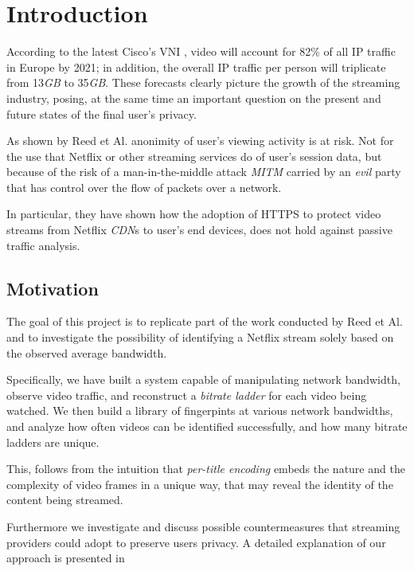 \chapter{Introduction}\label{sec:introduction}

According to the latest Cisco's VNI \cite{video-traffic-forecast}, video will
account for 82\% of all IP traffic in Europe by 2021; in addition, the overall IP
traffic per person will triplicate from 13\emph{GB} to 35\emph{GB}. These
forecasts clearly picture the growth of the streaming industry, posing, at the
same time an important question on the present and future states of the final
user's privacy.

As shown by Reed et Al. \cite{netflix-real-time} anonimity of user's viewing
activity is at risk. Not for the use that Netflix or other streaming services
do of user's session data, but because of the risk of a man-in-the-middle
attack \emph{MITM} carried by an \textit{evil} party that has control over the
flow of packets over a network.

In particular, they have shown how the adoption of HTTPS to protect video
streams from Netflix \emph{CDN}s to user's end devices, does not hold against
passive traffic analysis.

\section{Motivation}\label{motivation}

The goal of this project is to replicate part of the work conducted by Reed et
Al. and to investigate the possibility of identifying a Netflix stream solely
based on the observed average bandwidth. 

Specifically, we have built a system capable of manipulating network bandwidth,
observe video traffic, and reconstruct a \emph{bitrate ladder} for each video
being watched. We then build a library of fingerpints at various network
bandwidths, and analyze how often videos can be identified successfully, and
how many bitrate ladders are unique.

This, follows from the intuition that \emph{per-title encoding} embeds the
nature and the complexity of video frames in a unique way, that may reveal the
identity of the content being streamed.

Furthermore we investigate and discuss possible countermeasures that streaming
providers could adopt to preserve users privacy. A detailed explanation of our
approach is presented in 

